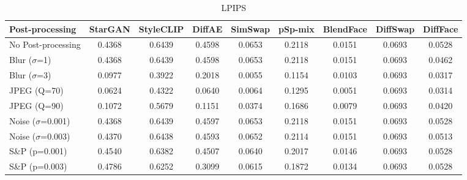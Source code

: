 \documentclass{article}
\begin{document}
\begin{table}[h!]
\begin{subtable}{\textwidth}
\caption{LPIPS}
\centering
\scriptsize
\begin{tabular}{lcccccccc}
\toprule
\textbf{Post-processing} & StarGAN & StyleCLIP & DiffAE & SimSwap & pSp-mix & BlendFace & DiffSwap & DiffFace \\
\midrule
No Post-processing & 0.4368 & 0.6439 & 0.4598 & 0.0653 & 0.2118 & 0.0151 & 0.0693 & 0.0528 \\
\midrule
Blur ($\sigma$=1) & 0.4368 & 0.6439 & 0.4598 & 0.0653 & 0.2118 & 0.0151 & 0.0693 & 0.0462 \\
Blur ($\sigma$=3) & 0.0977 & 0.3922 & 0.2018 & 0.0055 & 0.1154 & 0.0103 & 0.0693 & 0.0317 \\
JPEG (Q=70) & 0.0624 & 0.4322 & 0.0640 & 0.0064 & 0.1295 & 0.0051 & 0.0693 & 0.0314 \\
JPEG (Q=90) & 0.1072 & 0.5679 & 0.1151 & 0.0374 & 0.1686 & 0.0079 & 0.0693 & 0.0420 \\
Noise ($\sigma$=0.001) & 0.4368 & 0.6439 & 0.4597 & 0.0653 & 0.2118 & 0.0151 & 0.0693 & 0.0528 \\
Noise ($\sigma$=0.003) & 0.4370 & 0.6438 & 0.4593 & 0.0652 & 0.2114 & 0.0151 & 0.0693 & 0.0513 \\
S\&P (p=0.001) & 0.4540 & 0.6382 & 0.4507 & 0.0640 & 0.2017 & 0.0146 & 0.0693 & 0.0528 \\
S\&P (p=0.003) & 0.4786 & 0.6252 & 0.3099 & 0.0615 & 0.1872 & 0.0134 & 0.0693 & 0.0528 \\
\bottomrule
\end{tabular}
\end{subtable}


\end{table}
\end{document}
